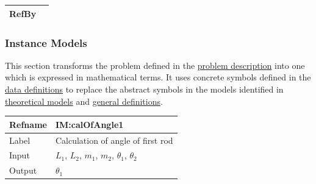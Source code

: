 \documentclass[12pt]{article}
\begin{document}
{\begin{minipage}{\textwidth}
\begin{tabular}{>{\raggedright}p{}>{\raggedright\arraybackslash}p{}}
\\ \midrule
RefBy & 
\\ \bottomrule
\end{tabular}
\end{minipage}

\subsubsection{Instance Models}
\label{Sec:IMs}
This section transforms the problem defined in the \hyperref[Sec:ProbDesc]{problem description} into one which is expressed in mathematical terms. It uses concrete symbols defined in the \hyperref[Sec:DDs]{data definitions} to replace the abstract symbols in the models identified in \hyperref[Sec:TMs]{theoretical models} and \hyperref[Sec:GDs]{general definitions}.

\medskip
\noindent
\begin{minipage}{\textwidth}
\begin{tabular}{>{\raggedright}p{}>{\raggedright\arraybackslash}p{}}
\toprule \textbf{Refname} & \textbf{IM:calOfAngle1}
\label{IM:calOfAngle1}
\\ \midrule
Label & Calculation of angle of first rod
        
\\ \midrule
Input & ${L_{1}}$, ${L_{2}}$, ${m_{1}}$, ${m_{2}}$, ${θ_{1}}$, ${θ_{2}}$
        
\\ \midrule
Output & ${θ_{1}}$
         

\end{tabular}
\end{minipage}}
\end{document}

